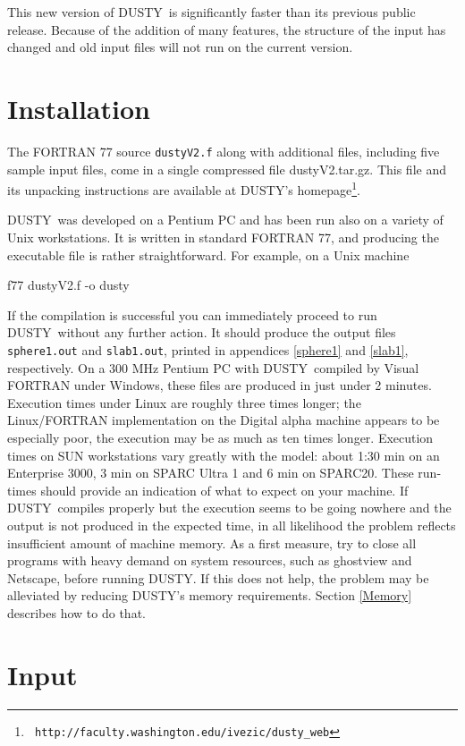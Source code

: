 \documentclass[12pt]{article} \usepackage{epsf}
\def\Section#1{\section{\sc #1}}
\def\D  {{\sf DUSTY}}
\begin{document}
This new version of \D\ is significantly faster than its previous public
release. Because of the addition of many features, the structure of the input
has changed and old input files will not run on the current version.

\Section{Installation}

The FORTRAN 77 source {\tt dustyV2.f} along with additional files, including five
sample input files, come in a single compressed file dustyV2.tar.gz. This file
and its unpacking instructions are available at \D's homepage\footnote{{\tt
http://faculty.washington.edu/ivezic/dusty\_web}}. 

\D\ was developed on a Pentium PC and has been run also on a variety of Unix
workstations. It is written in standard FORTRAN 77, and producing the
executable file is rather straightforward.  For example, on a Unix machine

\bigskip

  f77 dustyV2.f -o dusty

\bigskip\noindent If the compilation is successful you can immediately proceed
to run \D\ without any further action. It should produce the output files {\tt
sphere1.out} and {\tt slab1.out}, printed in appendices \ref{sphere1} and
\ref{slab1}, respectively.  On a 300 MHz Pentium PC with \D\ compiled by Visual
FORTRAN under Windows, these files are produced in just under 2 minutes.
Execution times under Linux are roughly three times longer; the Linux/FORTRAN
implementation on the Digital alpha machine appears to be especially poor, the
execution may be as much as ten times longer. Execution times on SUN
workstations vary greatly with the model: about 1:30 min on an Enterprise 3000,
3 min on SPARC Ultra 1 and 6 min on SPARC20. These run-times should provide an
indication of what to expect on your machine. If \D\ compiles properly but the
execution seems to be going nowhere and the output is not produced in the
expected time, in all likelihood the problem reflects insufficient amount of
machine memory. As a first measure, try to close all programs with heavy demand
on system resources, such as ghostview and Netscape, before running \D.  If
this does not help, the problem may be alleviated by reducing \D's memory
requirements. Section \ref{Memory} describes how to do that.


\Section{Input}
\end{document}
